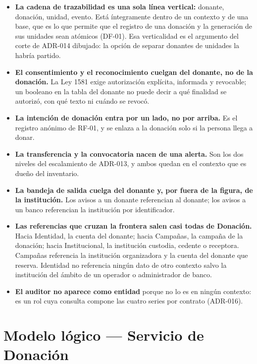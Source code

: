 \documentclass[11pt,a4paper]{article}
\begin{document}
\begin{itemize}
\item \textbf{La cadena de trazabilidad es una sola línea vertical:} donante, donación, unidad, evento. Está íntegramente dentro de un contexto y de una base, que es lo que permite que el registro de una donación y la generación de sus unidades sean atómicos (DF-01). Esa verticalidad es el argumento del corte de ADR-014 dibujado: la opción de separar donantes de unidades la habría partido.
\item \textbf{El consentimiento y el reconocimiento cuelgan del donante, no de la donación.} La Ley 1581 exige autorización explícita, informada y revocable; un booleano en la tabla del donante no puede decir a qué finalidad se autorizó, con qué texto ni cuándo se revocó.
\item \textbf{La intención de donación entra por un lado, no por arriba.} Es el registro anónimo de RF-01, y se enlaza a la donación solo si la persona llega a donar.
\item \textbf{La transferencia y la convocatoria nacen de una alerta.} Son los dos niveles del escalamiento de ADR-013, y ambos quedan en el contexto que es dueño del inventario.
\item \textbf{La bandeja de salida cuelga del donante y, por fuera de la figura, de la institución.} Los avisos a un donante referencian al donante; los avisos a un banco referencian la institución por identificador.
\item \textbf{Las referencias que cruzan la frontera salen casi todas de Donación.} Hacia Identidad, la cuenta del donante; hacia Campañas, la campaña de la donación; hacia Institucional, la institución custodia, cedente o receptora. Campañas referencia la institución organizadora y la cuenta del donante que reserva. Identidad no referencia ningún dato de otro contexto salvo la institución del ámbito de un operador o administrador de banco.
\item \textbf{El auditor no aparece como entidad} porque no lo es en ningún contexto: es un rol cuya consulta compone las cuatro series por contrato (ADR-016).
\end{itemize}

\section{Modelo lógico --- Servicio de Donación}
\label{sec:donacion}
\end{document}
